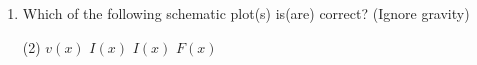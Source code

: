 
\begin{enumerate}
    \item Which of the following schematic plot(s) is(are) correct? (Ignore gravity)
        \begin{tasks}(2)
            \task \( v(x) \) 
            \task \( I(x) \) 
            \task \( I(x) \) 
            \task \( F(x) \)
        \end{tasks}
\end{enumerate}
